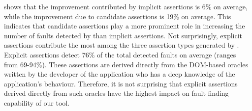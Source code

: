  shows that the improvement contributed by implicit assertions is 6\% on average, while the improvement due to candidate assertions is 19\% on average. This indicates that candidate assertions play a more prominent role in increasing the number of faults detected by \tool than implicit assertions. Not surprisingly, explicit assertions contribute the most among the three assertion types generated by \tool. Explicit assertions detect 76\% of the total detected faults on average (ranges from 69-94\%). These assertions are derived directly from the DOM-based oracles written by the developer of the application who has a deep knowledge of the application's behaviour. Therefore, it is not surprising that explicit assertions derived directly from such oracles have the highest impact on fault finding capability of our tool.        

